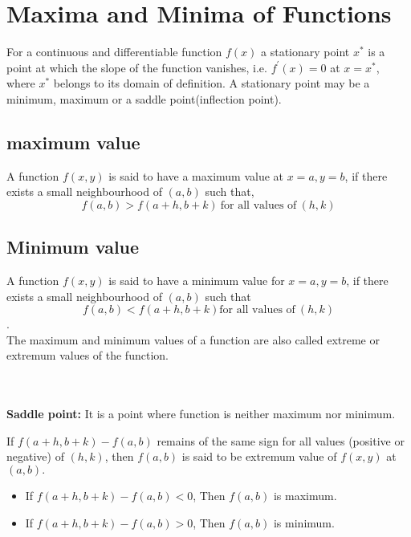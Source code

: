\section{Maxima and Minima of Functions}
For a continuous and differentiable function $f(x)$ a stationary point $x^{*}$ is a point at which the slope of the function vanishes, i.e. $f^{\prime}(x)=0$ at $x=x^{*}$, where $x^{*}$ belongs to its domain of
definition. A stationary point may be a minimum, maximum or a saddle point(inflection point). 
\subsection{maximum value}
A function $f(x, y)$ is said to have a maximum value at $x=a, y=b$, if there exists a small neighbourhood of $(a, b)$ such that,
$$
f(a, b)>f(a+h, b+k)\ \text{for all values of}\ \left(h,k \right)
$$
\subsection{Minimum value }
A function $f(x, y)$ is said to have a minimum value for $x=a, y=b$, if there exists a small neighbourhood of
 $(a, b)$ such that $$f(a, b)<f(a+h, b+k) \text{for all values of}\ \left(h,k \right)$$.
 \\The maximum and minimum values of a function are also called extreme or extremum values of the function.

 \begin{note}
 	 \leavevmode
 	\\\\
 	\textbf{Saddle point:} It is a point where function is neither maximum nor minimum.
 \end{note}
If $f(a+h, b+k)-f(a, b)$ remains of the same sign for all values (positive or negative) of $(h, k)$, then $f(a, b)$ is said to be extremum value of $f(x, y)$ at $(a, b).$
\begin{itemize}
	\item If $f(a+h, b+k)-f(a, b)<0$, Then $f(a, b)$ is maximum.
	\item If $f(a+h, b+k)-f(a, b)>0$, Then $f(a, b)$ is minimum.
\end{itemize}
